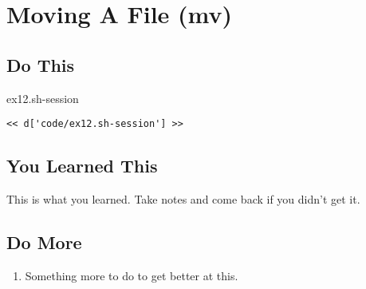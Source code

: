 \chapter{Moving A File (mv)}

\section{Do This}

\begin{code}{ex12.sh-session}
\begin{Verbatim}
<< d['code/ex12.sh-session'] >>
\end{Verbatim}
\end{code}


\section{You Learned This}

This is what you learned.  Take notes and come back if you didn't get it.

\section{Do More}

\begin{enumerate}
\item Something more to do to get better at this.
\end{enumerate}

